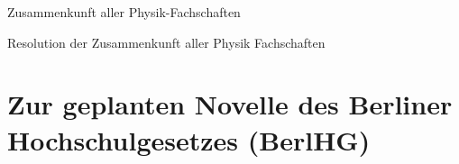 \documentclass[DIV=14]{scrartcl}
\begin{document}
\hspace{0.87\textwidth}
\begin{minipage}{120pt}
\vspace{-1.8cm}
\centering
\small Zusammenkunft aller Physik-Fachschaften
\end{minipage}

\begin{center}
\huge{Resolution der Zusammenkunft aller Physik Fachschaften}\vspace{.25\baselineskip}\\
\normalsize
\end{center}
\vspace{1cm}


\section*{Zur geplanten Novelle des Berliner Hochschulgesetzes (BerlHG)}




\end{document}
